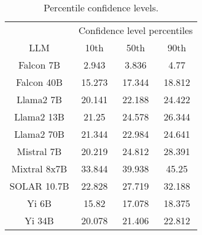 \begin{table*}
\centering
\begin{tabular}{c|c|c|c}
& \multicolumn{3}{c}{Confidence level percentiles} \\ 
LLM & 10th & 50th & 90th\\ \hline
Falcon 7B & 2.943 & 3.836 & 4.77\\
Falcon 40B & 15.273 & 17.344 & 18.812\\
Llama2 7B & 20.141 & 22.188 & 24.422\\
Llama2 13B & 21.25 & 24.578 & 26.344\\
Llama2 70B & 21.344 & 22.984 & 24.641\\
Mistral 7B & 20.219 & 24.812 & 28.391\\
Mixtral 8x7B & 33.844 & 39.938 & 45.25\\
SOLAR 10.7B & 22.828 & 27.719 & 32.188\\
Yi 6B & 15.82 & 17.078 & 18.375\\
Yi 34B & 20.078 & 21.406 & 22.812\\
\hline
\end{tabular}
\caption{Percentile confidence levels.}
\label{tab:percentile_conf}
\end{table*}
